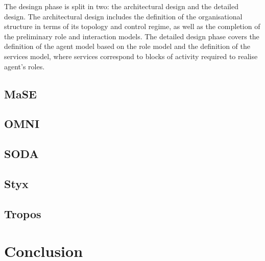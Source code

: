 \documentclass{article}
\begin{document}
The desingn phase is split in two: the architectural design and the detailed
design. The architectural design includes the definition of the organisational
structure in terms of its topology and control regime, as well as the
completion of the preliminary role and interaction models. The detailed design
phase covers the definition of the agent model based on the role model and the
definition of the services model, where services correspond to blocks of
activity required to realise agent's roles.

\subsection{MaSE}
\subsection{OMNI}
\subsection{SODA}
\subsection{Styx}
\subsection{Tropos}
\section{Conclusion}



\end{document}

